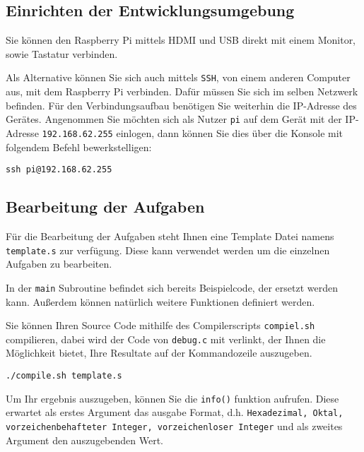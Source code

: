 \documentclass[12pt]{article}
\begin{document}
\subsection{Einrichten der Entwicklungsumgebung}
Sie können den Raspberry Pi mittels HDMI und USB direkt mit einem Monitor, sowie
Tastatur verbinden. 

Als Alternative können Sie sich auch mittels \texttt{SSH},
von einem anderen Computer aus, mit dem Raspberry Pi verbinden. Dafür müssen Sie
sich im selben Netzwerk befinden. Für den Verbindungsaufbau benötigen Sie
weiterhin die IP-Adresse des Gerätes. Angenommen Sie möchten sich als Nutzer
\texttt{pi} auf dem Gerät mit der IP-Adresse \texttt{192.168.62.255} einlogen,
dann können Sie dies über die Konsole mit folgendem Befehl bewerkstelligen:

\begin{lstlisting}
ssh pi@192.168.62.255
\end{lstlisting}


\subsection{Bearbeitung der Aufgaben}
Für die Bearbeitung der Aufgaben steht Ihnen eine Template Datei namens
\texttt{template.s} zur verfügung. Diese kann verwendet werden um die einzelnen
Aufgaben zu bearbeiten.

In der \texttt{main} Subroutine befindet sich bereits Beispielcode, der ersetzt
werden kann. Außerdem können natürlich weitere Funktionen definiert werden.

Sie können Ihren Source Code mithilfe des Compilerscripts \texttt{compiel.sh}
compilieren, dabei wird der Code von \texttt{debug.c} mit verlinkt, der Ihnen
die Möglichkeit bietet, Ihre Resultate auf der Kommandozeile auszugeben.

\begin{lstlisting}
./compile.sh template.s
\end{lstlisting}

Um Ihr ergebnis auszugeben, können Sie die \texttt{info()} funktion aufrufen.
Diese erwartet als erstes Argument das ausgabe Format, d.h.
\texttt{Hexadezimal, Oktal, vorzeichenbehafteter Integer, vorzeichenloser
Integer} und als zweites Argument den auszugebenden Wert.
\end{document}
